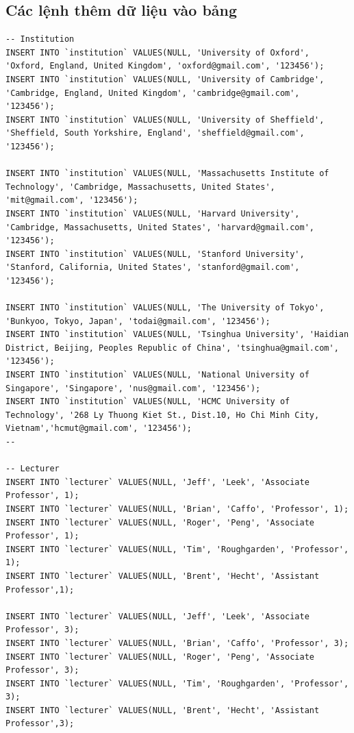 \documentclass[12pt,a4paper,titlepage]{article}
\begin{document}
\subsection{Các lệnh thêm dữ liệu vào bảng}
\begin{lstlisting}
-- Institution
INSERT INTO `institution` VALUES(NULL, 'University of Oxford', 'Oxford, England, United Kingdom', 'oxford@gmail.com', '123456');
INSERT INTO `institution` VALUES(NULL, 'University of Cambridge', 'Cambridge, England, United Kingdom', 'cambridge@gmail.com', '123456');
INSERT INTO `institution` VALUES(NULL, 'University of Sheffield', 'Sheffield, South Yorkshire, England', 'sheffield@gmail.com', '123456');

INSERT INTO `institution` VALUES(NULL, 'Massachusetts Institute of Technology', 'Cambridge, Massachusetts, United States', 'mit@gmail.com', '123456');
INSERT INTO `institution` VALUES(NULL, 'Harvard University', 'Cambridge, Massachusetts, United States', 'harvard@gmail.com', '123456');
INSERT INTO `institution` VALUES(NULL, 'Stanford University', 'Stanford, California, United States', 'stanford@gmail.com', '123456');

INSERT INTO `institution` VALUES(NULL, 'The University of Tokyo', 'Bunkyoo, Tokyo, Japan', 'todai@gmail.com', '123456');
INSERT INTO `institution` VALUES(NULL, 'Tsinghua University', 'Haidian District, Beijing, Peoples Republic of China', 'tsinghua@gmail.com', '123456');
INSERT INTO `institution` VALUES(NULL, 'National University of Singapore', 'Singapore', 'nus@gmail.com', '123456');
INSERT INTO `institution` VALUES(NULL, 'HCMC University of Technology', '268 Ly Thuong Kiet St., Dist.10, Ho Chi Minh City, Vietnam','hcmut@gmail.com', '123456');
--

-- Lecturer
INSERT INTO `lecturer` VALUES(NULL, 'Jeff', 'Leek', 'Associate Professor', 1);
INSERT INTO `lecturer` VALUES(NULL, 'Brian', 'Caffo', 'Professor', 1);
INSERT INTO `lecturer` VALUES(NULL, 'Roger', 'Peng', 'Associate Professor', 1);
INSERT INTO `lecturer` VALUES(NULL, 'Tim', 'Roughgarden', 'Professor', 1);
INSERT INTO `lecturer` VALUES(NULL, 'Brent', 'Hecht', 'Assistant Professor',1);

INSERT INTO `lecturer` VALUES(NULL, 'Jeff', 'Leek', 'Associate Professor', 3);
INSERT INTO `lecturer` VALUES(NULL, 'Brian', 'Caffo', 'Professor', 3);
INSERT INTO `lecturer` VALUES(NULL, 'Roger', 'Peng', 'Associate Professor', 3);
INSERT INTO `lecturer` VALUES(NULL, 'Tim', 'Roughgarden', 'Professor', 3);
INSERT INTO `lecturer` VALUES(NULL, 'Brent', 'Hecht', 'Assistant Professor',3);


\end{lstlisting}
\end{document}
